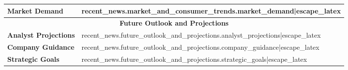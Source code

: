 \documentclass{article}
\begin{document}
\begin{table}[H]
\begin{tabularx}{\textwidth}{|m{5cm}|>{\raggedright\arraybackslash}X|}
        \hline
        \textbf{Market Demand} & {{ recent_news.market_and_consumer_trends.market_demand|escape_latex }} \\
        \hline
        \multicolumn{2}{|c|}{\textbf{Future Outlook and Projections}} \\
        \hline
        \textbf{Analyst Projections} & {{ recent_news.future_outlook_and_projections.analyst_projections|escape_latex }} \\
        \hline
        \textbf{Company Guidance} & {{ recent_news.future_outlook_and_projections.company_guidance|escape_latex }} \\
        \hline
        \textbf{Strategic Goals} & {{ recent_news.future_outlook_and_projections.strategic_goals|escape_latex }} \\
        \hline
    \end{tabularx}
\end{table}
\end{document}
